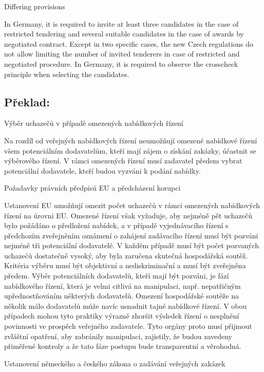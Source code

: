 \documentclass[10pt]{article}
\begin{document}
Differing provisions

In Germany, it is required to invite at least three candidates in the case of restricted tendering and several suitable candidates in the case of awards by negotiated contract.
Except in two specific cases, the new Czech regulations do not allow limiting the number of invited tenderers in case of restricted and negotiated procedure.
In Germany, it is required to observe the crosscheck principle when selecting the candidates.


\pagebreak

\subsection*{Překlad:}



Výběr uchazečů v případě omezených nabídkových řízení

Na rozdíl od veřejných nabídkových řízení neumožňují omezené nabídkové řízení všem potenciálním dodavatelům, kteří mají zájem o získání zakázky, účastnit se výběrového řízení.
V rámci omezených řízení musí zadavatel předem vybrat potenciální dodavatele, kteří budou vyzváni k podání nabídky.


Požadavky právních předpisů EU a předcházení korupci

Ustanovení EU umožňují omezit počet uchazečů v rámci omezených nabídkových řízení na úrovni EU.
Omezené řízení však vyžaduje, aby nejméně pět uchazečů bylo požádáno o předložení nabídek, a v případě vyjednávacího řízení s předchozím zveřejněním oznámení o zahájení zadávacího řízení musí být pozváni nejméně tři potenciální dodavatelé.
V každém případě musí být počet pozvaných uchazečů dostatečně vysoký, aby byla zaručena skutečná hospodářská soutěž.
Kritéria výběru musí být objektivní a nediskriminační a musí být zveřejněna předem.
Výběr potenciálních dodavatelů, kteří mají být pozváni, je fází nabídkového řízení, která je velmi citlivá na manipulaci, např. nepatřičným upřednostňováním některých dodavatelů.
Omezení hospodářské soutěže na několik málo dodavatelů může navíc usnadnit tajné nabídkové řízení.
V obou případech mohou tyto praktiky výrazně zhoršit výsledek řízení o nesplnění povinnosti ve prospěch veřejného zadavatele.
Tyto orgány proto musí přijmout zvláštní opatření, aby zabránily manipulaci, zajistily, že budou zavedeny přiměřené kontroly a že tato fáze postupu bude transparentní a věrohodná.


Ustanovení německého a českého zákona o zadávání veřejných zakázek
\end{document}

